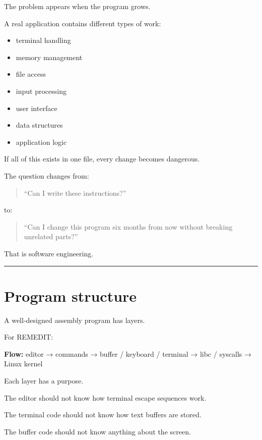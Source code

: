 \documentclass[
  oneside,
  openany]{book}
\providecommand{\tightlist}{%
  \setlength{\itemsep}{0pt}\setlength{\parskip}{0pt}}
\begin{document}
The problem appears when the program grows.

A real application contains different types of work:

\begin{itemize}
\tightlist
\item
  terminal handling
\item
  memory management
\item
  file access
\item
  input processing
\item
  user interface
\item
  data structures
\item
  application logic
\end{itemize}

If all of this exists in one file, every change becomes dangerous.

The question changes from:

\begin{quote}
``Can I write these instructions?''
\end{quote}

to:

\begin{quote}
``Can I change this program six months from now without breaking
unrelated parts?''
\end{quote}

That is software engineering.

\begin{center}\rule{0.5\linewidth}{0.5pt}\end{center}

\hypertarget{program-structure}{%
\section{Program structure}\label{program-structure}}

A well-designed assembly program has layers.

For REMEDIT:

\textbf{Flow:} editor → commands → buffer / keyboard / terminal → libc /
syscalls → Linux kernel

Each layer has a purpose.

The editor should not know how terminal escape sequences work.

The terminal code should not know how text buffers are stored.

The buffer code should not know anything about the screen.
\end{document}

